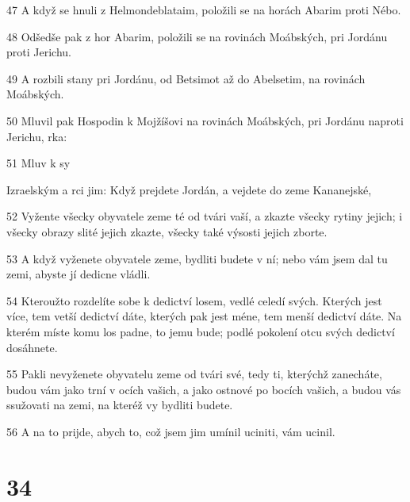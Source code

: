 \par 47 A když se hnuli z Helmondeblataim, položili se na horách Abarim proti Nébo.
\par 48 Odšedše pak z hor Abarim, položili se na rovinách Moábských, pri Jordánu proti Jerichu.
\par 49 A rozbili stany pri Jordánu, od Betsimot až do Abelsetim, na rovinách Moábských.
\par 50 Mluvil pak Hospodin k Mojžíšovi na rovinách Moábských, pri Jordánu naproti Jerichu, rka:
\par 51 Mluv k sy\par Izraelským a rci jim: Když prejdete Jordán, a vejdete do zeme Kananejské,
\par 52 Vyžente všecky obyvatele zeme té od tvári vaší, a zkazte všecky rytiny jejich; i všecky obrazy slité jejich zkazte, všecky také výsosti jejich zborte.
\par 53 A když vyženete obyvatele zeme, bydliti budete v ní; nebo vám jsem dal tu zemi, abyste jí dedicne vládli.
\par 54 Kteroužto rozdelíte sobe k dedictví losem, vedlé celedí svých. Kterých jest více, tem vetší dedictví dáte, kterých pak jest méne, tem menší dedictví dáte. Na kterém míste komu los padne, to jemu bude; podlé pokolení otcu svých dedictví dosáhnete.
\par 55 Pakli nevyženete obyvatelu zeme od tvári své, tedy ti, kterýchž zanecháte, budou vám jako trní v ocích vašich, a jako ostnové po bocích vašich, a budou vás ssužovati na zemi, na kteréž vy bydliti budete.
\par 56 A na to prijde, abych to, což jsem jim umínil uciniti, vám ucinil.

\chapter{34}

